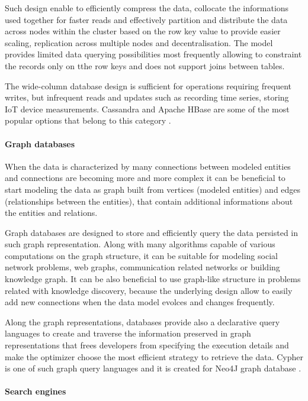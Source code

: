 Such design enable to efficiently compress the data, collocate the informations used together for faster reads and effectively partition and distribute the data across nodes within the cluster based on the row key value to provide easier scaling, replication across multiple nodes and decentralisation. The model provides limited data querying possibilities most frequently allowing to constraint the records only on tthe row keys and does not support joins between tables.

The wide-column database design is sufficient for operations requiring frequent writes, but infrequent reads and updates such as recording time series, storing IoT device measurements. Cassandra and Apache HBase are some of the most popular options that belong to this category \cite{NoSQLDatabaseSystemsSurveyDecisionGuidance}.

\paragraph*{Graph databases}

When the data is characterized by many connections between modeled entities and connections are becoming more and more complex it can be beneficial to start modeling the data as graph built from vertices (modeled entities) and edges (relationships between the entities), that contain additional informations about the entities and relations. 

Graph databases are designed to store and efficiently query the data persisted in such graph representation. Along with many algorithms capable of various computations on the graph structure, it can be suitable for modeling social network problems, web graphs, communication related networks or building knowledge graph. It can be also beneficial to use graph-like structure in problems related with knowledge discovery, because the underlying design allow to easily add new connections when the data model evolces and changes frequently.

Along the graph representations, databases provide also a declarative query languages to create and traverse the information preserved in graph representations that frees developers from specifying the execution details and make the optimizer choose the most efficient strategy to retrieve the data. Cypher is one of such graph query languages and it is created for Neo4J graph database \cite{DesignDataIntensiveApplications}.

\paragraph*{Search engines}

